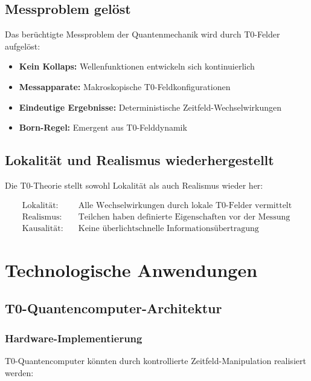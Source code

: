 \documentclass[12pt,a4paper]{article}
\begin{document}
	\subsection{Messproblem gelöst}
	
	Das berüchtigte Messproblem der Quantenmechanik wird durch T0-Felder aufgelöst:
	
	\begin{itemize}
		\item \textbf{Kein Kollaps:} Wellenfunktionen entwickeln sich kontinuierlich
		\item \textbf{Messapparate:} Makroskopische T0-Feldkonfigurationen
		\item \textbf{Eindeutige Ergebnisse:} Deterministische Zeitfeld-Wechselwirkungen
		\item \textbf{Born-Regel:} Emergent aus T0-Felddynamik
	\end{itemize}
	
	\subsection{Lokalität und Realismus wiederhergestellt}
	
	Die T0-Theorie stellt sowohl Lokalität als auch Realismus wieder her:
	
	\begin{align}
		\text{Lokalität:} &\quad \text{Alle Wechselwirkungen durch lokale T0-Felder vermittelt} \\
		\text{Realismus:} &\quad \text{Teilchen haben definierte Eigenschaften vor der Messung} \\
		\text{Kausalität:} &\quad \text{Keine überlichtschnelle Informationsübertragung}
	\end{align}
	
	\section{Technologische Anwendungen}
	
	\subsection{T0-Quantencomputer-Architektur}
	
	\subsubsection{Hardware-Implementierung}
	
	T0-Quantencomputer könnten durch kontrollierte Zeitfeld-Manipulation realisiert werden:
	
\end{document}
